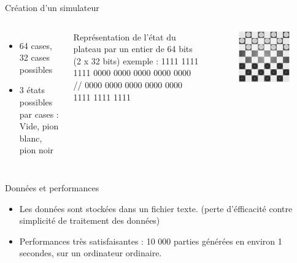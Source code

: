 \documentclass{beamer}
\begin{document}
\begin{frame}{Création d'un simulateur}
    \begin{columns}
        \begin{itemize}
            \item 64 cases, 32 cases possibles 
            \item 3 états possibles par cases :\newline
             Vide, pion blanc, pion noir
        \end{itemize}
        Représentation de l'état du plateau par un entier de 64 bits (\alert{2 x 32 bits})
        exemple : 1111 1111 1111 0000 0000 0000 0000 0000 //   0000 0000 0000 0000 0000 1111 1111 1111

        \begin{figure}
            \centering
            \includegraphics[width=\columnwidth]{im/dames2.png}
        \end{figure}
    \end{columns}
\end{frame}
\begin{frame}{Données et performances}
    \begin{itemize}
        \item Les données sont stockées dans un fichier texte. \newline
        (perte d'éfficacité contre simplicité de traitement des données)
        \item Performances très satisfaisantes :\newline
        \alert{10 000} parties générées en environ \alert{1 secondes}, sur un ordinateur ordinaire.
    \end{itemize}
\end{frame}
\end{document}
